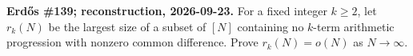 \textbf{Erd\H{o}s \#139; reconstruction, 2026-09-23.}
For a fixed integer $k\ge2$, let $r_k(N)$ be the largest size of a subset
of $[N]$ containing no $k$-term arithmetic progression with nonzero common
difference. Prove $r_k(N)=o(N)$ as $N\to\infty$.
